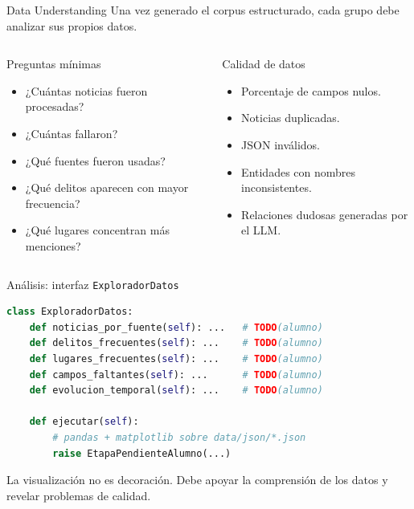 \documentclass[11pt,aspectratio=169]{beamer}
\begin{document}
\begin{frame}{Data Understanding}
\scriptsize
Una vez generado el corpus estructurado, cada grupo debe analizar sus propios datos.

\vspace{0.15cm}
\begin{columns}[T,onlytextwidth]
\begin{block}{Preguntas mínimas}
\begin{itemize}
\item ¿Cuántas noticias fueron procesadas?
\item ¿Cuántas fallaron?
\item ¿Qué fuentes fueron usadas?
\item ¿Qué delitos aparecen con mayor frecuencia?
\item ¿Qué lugares concentran más menciones?
\end{itemize}
\end{block}
\begin{alertblock}{Calidad de datos}
\begin{itemize}
\item Porcentaje de campos nulos.
\item Noticias duplicadas.
\item JSON inválidos.
\item Entidades con nombres inconsistentes.
\item Relaciones dudosas generadas por el LLM.
\end{itemize}
\end{alertblock}
\end{columns}
\end{frame}

\begin{frame}[fragile]{Análisis: interfaz \texttt{ExploradorDatos}}
\tiny
\begin{lstlisting}[language=Python]
class ExploradorDatos:
    def noticias_por_fuente(self): ...   # TODO(alumno)
    def delitos_frecuentes(self): ...    # TODO(alumno)
    def lugares_frecuentes(self): ...    # TODO(alumno)
    def campos_faltantes(self): ...      # TODO(alumno)
    def evolucion_temporal(self): ...    # TODO(alumno)

    def ejecutar(self):
        # pandas + matplotlib sobre data/json/*.json
        raise EtapaPendienteAlumno(...)
\end{lstlisting}

\scriptsize
La visualización no es decoración. Debe apoyar la comprensión de los datos y revelar problemas de calidad.
\end{frame}
\end{document}
